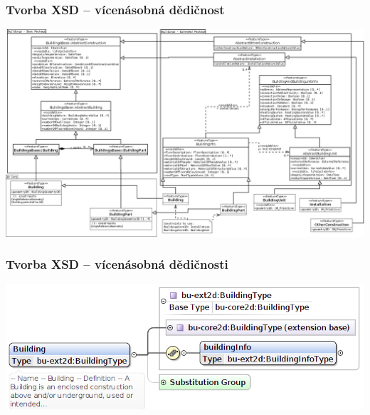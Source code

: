 \begin{frame}
\frametitle{Tvorba XSD -- vícenásobná dědičnost}
\begin{center}
\includegraphics[scale=0.15]{obrazky/BuildingsExtended2D.png}
\end{center}
\end{frame}

\begin{frame}
\frametitle{Tvorba XSD -- vícenásobná dědičnosti}
\begin{center}
\includegraphics[scale=0.4]{obrazky/BU_dedicnost_info.png}
\end{center}

\end{frame}